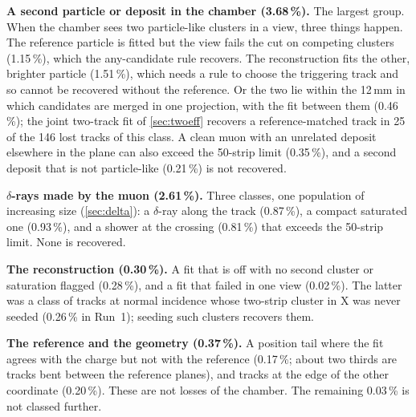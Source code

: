 \textbf{A second particle or deposit in the chamber (3.68\,\%).} The largest group. When the chamber sees two
particle-like clusters in a view, three things happen. The reference particle is fitted but the view fails the cut on
competing clusters (1.15\,\%), which the any-candidate rule recovers. The reconstruction fits the other, brighter
particle (1.51\,\%), which needs a rule to choose the triggering track and so cannot be recovered without the
reference. Or the two lie within the 12\,mm in which candidates are merged in one projection, with the fit between
them (0.46\,\%); the joint two-track fit of \cref{sec:twoeff} recovers a reference-matched track in 25 of the 146 lost
tracks of this class. A clean muon with an unrelated deposit elsewhere in the plane can also exceed the 50-strip limit
(0.35\,\%), and a second deposit that is not particle-like (0.21\,\%) is not recovered.

\textbf{$\delta$-rays made by the muon (2.61\,\%).} Three classes, one population of increasing size
(\cref{sec:delta}): a $\delta$-ray along the track (0.87\,\%), a compact saturated one (0.93\,\%), and a shower at the
crossing (0.81\,\%) that exceeds the 50-strip limit. None is recovered.

\textbf{The reconstruction (0.30\,\%).} A fit that is off with no second cluster or saturation flagged (0.28\,\%), and a
fit that failed in one view (0.02\,\%). The latter was a class of tracks at normal incidence whose two-strip cluster in
X was never seeded (0.26\,\% in Run~1); seeding such clusters recovers them.

\textbf{The reference and the geometry (0.37\,\%).} A position tail where the fit agrees with the charge but not with
the reference (0.17\,\%; about two thirds are tracks bent between the reference planes), and tracks at the edge of the
other coordinate (0.20\,\%). These are not losses of the chamber. The remaining 0.03\,\% is not classed further.


